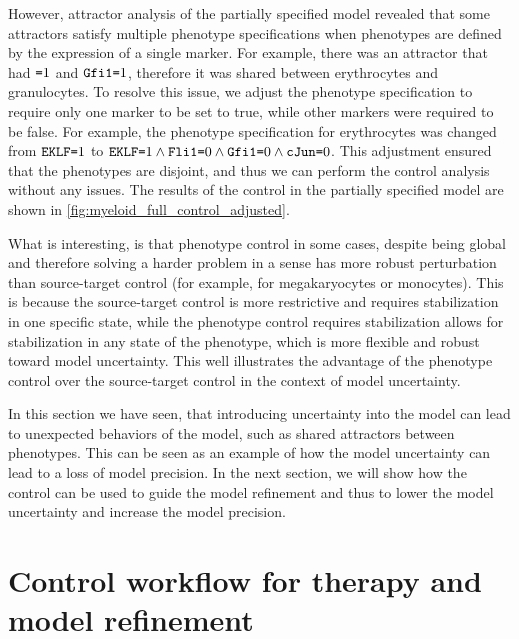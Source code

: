 However, attractor analysis of the partially specified model revealed that some attractors satisfy multiple phenotype specifications when phenotypes are defined by the expression of a single marker. For example, there was an attractor that had $\texttt{=}1$ and $\texttt{Gfi1}\texttt{=}1$, therefore it was shared between erythrocytes and granulocytes. To resolve this issue, we adjust the phenotype specification to require only one marker to be set to true, while other markers were required to be false. For example, the phenotype specification for erythrocytes was changed from $\texttt{EKLF}\texttt{=}1$ to $\texttt{EKLF}\texttt{=}1 \land \texttt{Fli1}\texttt{=}0 \land \texttt{Gfi1}\texttt{=}0 \land \texttt{cJun}\texttt{=}0$. This adjustment ensured that the phenotypes are disjoint, and thus we can perform the control analysis without any issues. The results of the control in the partially specified model are shown in \autoref{fig:myeloid_full_control_adjusted}. 

What is interesting, is that phenotype control in some cases, despite being global and therefore solving a harder problem in a sense has more robust perturbation than source-target control (for example, for megakaryocytes or monocytes). This is because the source-target control is more restrictive and requires stabilization in one specific state, while the phenotype control requires stabilization allows for stabilization in any state of the phenotype, which is more flexible and robust toward model uncertainty. This well illustrates the advantage of the phenotype control over the source-target control in the context of model uncertainty. 

In this section we have seen, that introducing uncertainty into the model can lead to unexpected behaviors of the model, such as shared attractors between phenotypes. This can be seen as an example of how the model uncertainty can lead to a loss of model precision. In the next section, we will show how the control can be used to guide the model refinement and thus to lower the model uncertainty and increase the model precision.


\section{Control workflow for therapy and model refinement}
\label{sec:control_workflow}

